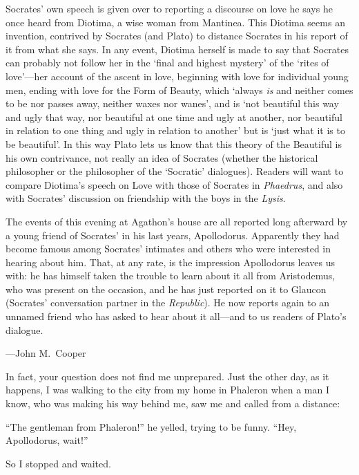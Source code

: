 Socrates’ own speech is given over to reporting a discourse on love
he says he once heard from Diotima, a wise woman from Mantinea.
This Diotima seems an invention, contrived by Socrates (and Plato)
to distance Socrates in his report of it from what she says. In
any event, Diotima herself is made to say that Socrates can
probably not follow her in the ‘final and highest mystery’ of the
‘rites of love’---her account of the ascent in love, beginning with love
for individual young men, ending with love for the Form of Beauty,
which ‘always {\em is} and neither comes to be nor passes away, neither
waxes nor wanes’, and is ‘not beautiful this way and ugly that
way, nor beautiful at one time and ugly at another, nor beautiful
in relation to one thing and ugly in relation to another’ but is
‘just what it is to be beautiful’. In this way Plato lets us know
that this theory of the Beautiful is his own contrivance, not
really an idea of Socrates (whether the historical philosopher or
the philosopher of the ‘Socratic’ dialogues). Readers will want to
compare Diotima’s speech on Love with those of Socrates in
{\em Phaedrus}, and also with Socrates’ discussion on friendship with 
the boys in the {\em Lysis}.

The events of this evening at Agathon’s house are all reported long
afterward by a young friend of Socrates’ in his last years,
Apollodorus. Apparently they had become famous among Socrates’
intimates and others who were interested in hearing about him.
That, at any rate, is the impression Apollodorus leaves us with:
he has himself taken the trouble to learn about it all from
Aristodemus, who was present on the occasion, and he has just
reported on it to Glaucon (Socrates’ conversation partner in the
{\em Republic}). He now reports again to an unnamed friend who has
asked to hear about it all---and to us readers of Plato’s
dialogue.

\blank[line]
\hfill ---John M.~Cooper\par
\stopchapter

\startchapter[title=Symposium]

\sayapollodorus In fact, your question does not find me
unprepared. Just the other day, as it happens, I was walking to the city
from my home in Phaleron when a man I know, who was making his way
behind me, saw me and called from a distance:

“The gentleman from Phaleron!” he yelled, trying to be funny. “Hey,
Apollodorus, wait!”

So I stopped and waited.

